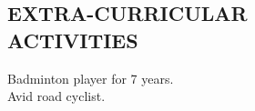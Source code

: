 \documentclass[margin, 10pt]{res} %
\begin{document}
\begin{resume}

    \section{EXTRA-CURRICULAR \\ ACTIVITIES}
    Badminton player for 7 years.\\
    Avid road cyclist.


\end{resume}
\end{document}
